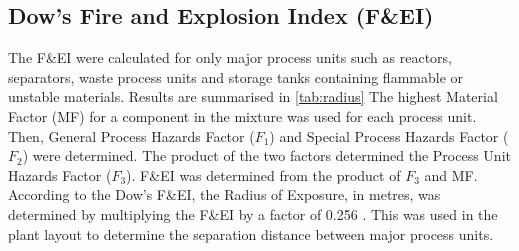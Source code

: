 \subsection{Dow's Fire and Explosion Index (F\&EI)}
The F\&EI were calculated for only major process units such as reactors, separators, waste process units and storage tanks containing flammable or unstable materials. Results are summarised in \cref{tab:radius} The highest Material Factor (MF) for a component in the mixture was used for each process unit. Then, General Process Hazards Factor ($F_1$) and Special Process Hazards Factor ($F_2$) were determined. The product of the two factors determined the Process Unit Hazards Factor ($F_3$). F\&EI was determined from the product of $F_3$ and MF. According to the Dow's F\&EI, the Radius of Exposure, in metres, was determined by multiplying the F\&EI by a factor of 0.256 \cite{aiche_dows_1994}. This was used in the plant layout to determine the separation distance between major process units.    